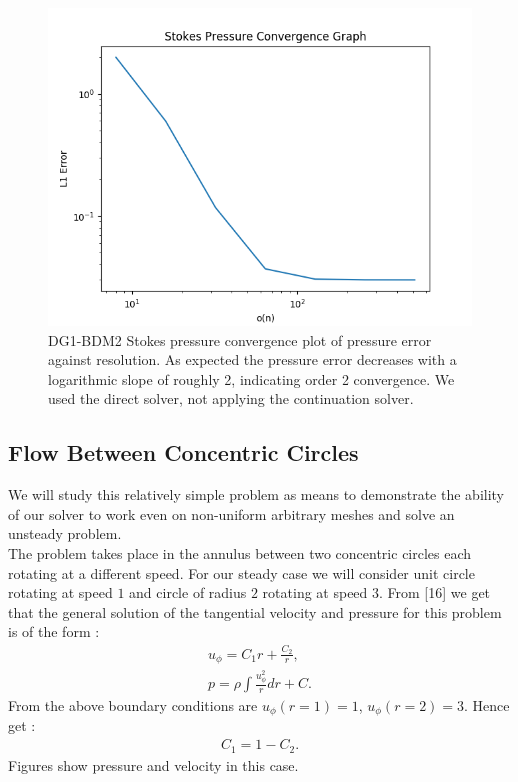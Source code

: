 \documentclass[11pt,twoside,a4paper]{article}
\begin{document}
\begin{figure}
\includegraphics[width=\linewidth]{navier_stokes_pressure_convergence_dbc0.png}
  \caption{DG1-BDM2 Stokes pressure convergence plot of pressure error against resolution. As expected the pressure error decreases with a logarithmic slope of roughly 2, indicating order 2 convergence. We used the direct solver, not applying the continuation solver.}
\end{figure}

\subsection{Flow Between Concentric Circles}

We will study this relatively simple problem as means to demonstrate the ability of our solver to work even on non-uniform arbitrary meshes and solve an unsteady problem.\\
The problem takes place in the annulus between two concentric circles each rotating at a different speed. For our steady case we will consider unit circle rotating at speed $1$ and circle of radius $2$ rotating at speed $3$.
From [16] we get that the general solution of the tangential velocity and pressure for this problem is of the form :
\begin{align}
u_{\phi} = C_1 r + \frac{C_2}{r} , \\
p = \rho \int \frac{u_{\phi}^2}{r} dr + C .
\end{align}
From the above boundary conditions are $u_{\phi}(r=1) = 1$, $u_{\phi}(r=2) = 3$. Hence get :
\begin{align*}
C_1 = 1 - C_2 .
\end{align*}
Figures show pressure and velocity in this case.\\
\end{document}
